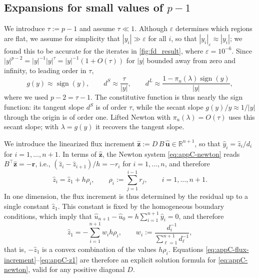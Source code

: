 \documentclass[11pt,pdflatex,sn-mathphys-num]{sn-jnl}
\theoremstyle{thmstyleone}%
\theoremstyle{thmstyletwo}%
\theoremstyle{thmstylethree}%
\newcommand{\bs}[1]{\ensuremath{\boldsymbol{#1}}}
\begin{document}
\subsection{Expansions for small values of $p-1$}
We introduce $\tau:=p-1$ and assume $\tau \ll 1$. Although $\varepsilon$ determines which regions are flat, we assume for simplicity that $|y_i|\gg\varepsilon$ for all $i$, so that $|y_i|_\varepsilon\approx|y_i|$; we found this to be accurate for the iterates in \cref{fig:fd_result}, where $\varepsilon=10^{-6}$. Since $|y|^{p-2}=|y|^{-1}|y|^{\tau}=|y|^{-1}(1+O(\tau))$ for $|y|$ bounded away from zero and infinity, to leading order in $\tau$,
\begin{equation}\label{eq:appC-expansions}
  g(y)\approx\operatorname{sign}(y),\qquad
  d^S\approx\frac{\tau}{|y|},\qquad
  d^L\approx\frac{1-\pi_u(\lambda)\operatorname{sign}(y)}{|y|},
\end{equation}
where we used $p-2=\tau-1$. The constitutive function is thus nearly the sign function: its tangent slope $d^S$ is of order $\tau$, while the secant slope $g(y)/y\approx1/|y|$ through the origin is of order one. Lifted Newton with $\pi_u(\lambda)=O(\tau)$ uses this secant slope; with $\lambda=g(y)$ it recovers the tangent slope.

We introduce the linearized flux increment $\hat{\bs z}:=D\,B\,\hat{\bs u}\in\mathbb R^{n+1}$, so that
  $\hat{y}_i=\hat z_i/d_i$ for $i=1,\dots,n+1$.
In terms of $\hat{\bs z}$, the Newton system \eqref{eq:appC-newton} reads $B^\top\hat{\bs z}=-\bs r$, i.e., $(\hat z_i-\hat z_{i+1})/h=-r_i$ for $i=1,\dots,n$, and therefore
\begin{equation}\label{eq:appC-flux-increment}
  \hat z_i=\hat z_1+h\rho_i,\qquad\rho_i:=\sum_{j=1}^{i-1}r_j,\qquad i=1,\dots,n+1 .
\end{equation}
In one dimension, the flux increment is thus determined by the residual up to a single constant $\hat z_1$. This constant is fixed by the homogeneous boundary conditions, which imply that $\hat u_{n+1}-\hat u_0=h\sum_{i=1}^{n+1}\hat{y}_i=0$, and therefore
\begin{equation}\label{eq:appC-z1}
  \hat z_1=-\sum_{i=1}^{n+1}w_ih\rho_i,\qquad w_i:=\frac{d_i^{-1}}{\sum_{\ell=1}^{n+1}d_\ell^{-1}},
\end{equation}
that is, $-\hat z_1$ is a convex combination of the values $h\rho_i$. Equations \eqref{eq:appC-flux-increment}--\eqref{eq:appC-z1} are therefore an explicit solution formula for \eqref{eq:appC-newton}, valid for any positive diagonal $D$.
\end{document}
